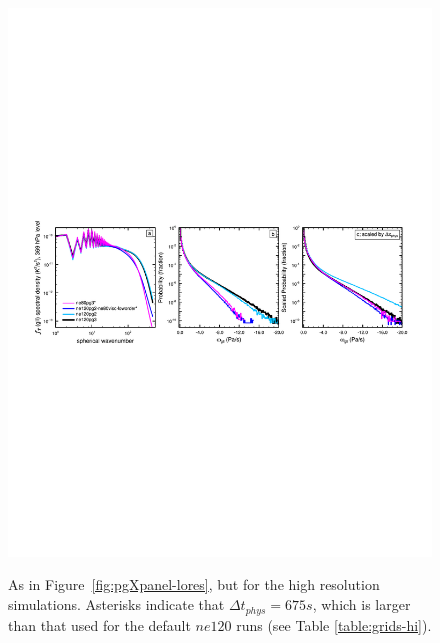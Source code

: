 \documentclass{agujournal}
\begin{document}
 \begin{figure}[t]
\begin{center}
\noindent\includegraphics[width=30pc,angle=0]{figs/panel_ne80pg3_ne120pg2_ne120pg3.pdf}\\
\end{center}
\caption{As in Figure~\ref{fig:pgXpanel-lores}, but for the high resolution simulations. Asterisks indicate that $\Delta t_{phys}=675 s$, which is larger than that used for the default $ne120$ runs (see Table \ref{table:grids-hi}).}
\label{fig:pgXpanel-hires}
\end{figure}
\end{document}
